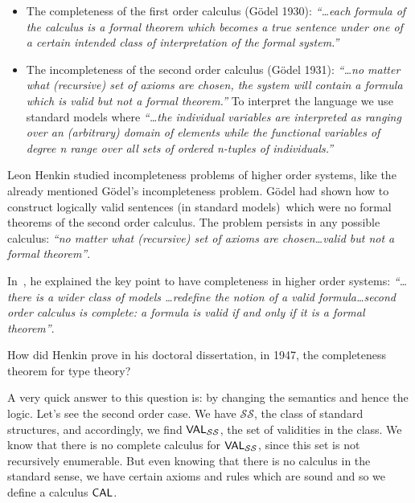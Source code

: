 \begin{itemize}
\item The completeness of the first order calculus (G\"{o}del 1930): 
\emph{``\ldots each formula of the calculus is a formal theorem which
becomes a true sentence under one of a certain intended class of
interpretation of the formal system.''}

\item The incompleteness of the second order calculus (G\"{o}del 1931): 
\emph{``\ldots no matter what (recursive) set of axioms are
chosen, the system will contain a formula which is valid but not a formal
theorem.''} To interpret the language we use standard models where
\emph{``\ldots the individual variables are interpreted as ranging over an (arbitrary)
domain of elements while the functional variables of degree n range over all
sets of ordered n-tuples of individuals.''}
\end{itemize}

Leon Henkin studied incompleteness problems of higher order systems, like
the already mentioned G\"{o}del's incompleteness problem. G\"{o}del had
shown how to construct logically valid sentences (in standard models)\ which
were no formal theorems of the second order calculus. The problem persists in
any possible calculus: \emph{``no matter what (recursive)
set of axioms are chosen\ldots valid but not a formal theorem''}.

In~\cite{Henkin1950}, he explained the key point to have
completeness in higher order systems: \emph{``\ldots there is a
wider class of models \ldots redefine the notion of a valid formula\ldots second
order calculus is complete: a formula is valid if and only if it is a formal
theorem''}.

How did Henkin prove in his doctoral dissertation, in 1947, the completeness
theorem for type theory?

A very quick answer to this question is: by changing the semantics and hence
the logic. Let's see the second order case. We have $\mathcal{SS}$, the class of standard structures, and accordingly, we find $\textsf{VAL}_{\mathcal{SS}}$, the set of validities in the class. We know that there is
no complete calculus for $\textsf{VAL}_{\mathcal{SS}}$, since this set is
not recursively enumerable. But even knowing that there is no calculus in
the standard sense, we have certain axioms and rules which are sound and so
we define a calculus $\textsf{CAL}$.

